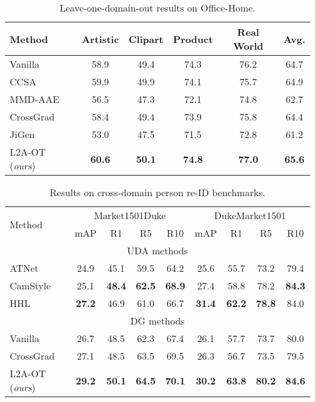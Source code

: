 \documentclass[runningheads]{llncs}
\begin{document}
\begin{table}[t]
\tabstyle{5pt}
\begin{tabular}{l | c c c c | c}
\hline
Method & Artistic & Clipart & Product & Real World & Avg. \\ \hline
Vanilla & 58.9 & 49.4 & {74.3} & {76.2} & 64.7 \\
CCSA~\cite{motiian2017unified} & {59.9} & {49.9} & 74.1 & 75.7 & {64.9} \\
MMD-AAE~\cite{li2018mmdaae} & 56.5 & 47.3 & 72.1 & 74.8 & 62.7 \\
CrossGrad~\cite{shankar2018generalizing} & 58.4 & 49.4 & 73.9 & 75.8 & 64.4 \\
JiGen~\cite{cvpr19JiGen} & 53.0 & 47.5 & 71.5 & 72.8 & 61.2 \\
L2A-OT  (\emph{ours}) & \textbf{60.6} & \textbf{50.1} & \textbf{74.8} & \textbf{77.0} & \textbf{65.6} \\
\hline
\end{tabular}
\caption{Leave-one-domain-out results on Office-Home.}
\label{tab:resOnOfficeHome}
\end{table}

\begin{table}[t]
\tabstyle{5pt}
\begin{tabular}{l | c c c c | c c c c}
\hline
\multirow{2}{*}{Method} & \multicolumn{4}{c|}{Market1501Duke} & \multicolumn{4}{c}{DukeMarket1501} \\
 & mAP & R1 & R5 & R10 & mAP & R1 & R5 & R10 \\
\hline
\multicolumn{9}{c}{UDA methods} \\
\hline
ATNet~\cite{liu2019adaptive} & 24.9 & 45.1 & 59.5 & 64.2 & 25.6 & 55.7 & 73.2 & 79.4 \\
CamStyle~\cite{zhong2019camstyle} & 25.1 & \textbf{48.4} & \textbf{62.5} & \textbf{68.9} & 27.4 & 58.8 & 78.2 & \textbf{84.3} \\
HHL~\cite{zhong2018gen} & \textbf{27.2} & 46.9 & 61.0 & 66.7 & \textbf{31.4} & \textbf{62.2} & \textbf{78.8} & 84.0 \\
\hline
\multicolumn{9}{c}{DG methods} \\
\hline
Vanilla & 26.7 & 48.5 & 62.3 & 67.4 & 26.1 & {57.7} & 73.7 & {80.0} \\
CrossGrad~\cite{shankar2018generalizing} & 27.1 & 48.5 & 63.5 & {69.5} & {26.3} & 56.7 & 73.5 & 79.5 \\
L2A-OT (\emph{ours}) & \textbf{29.2} & \textbf{50.1} & \textbf{64.5} & \textbf{70.1} & \textbf{30.2} & \textbf{63.8} & \textbf{80.2} & \textbf{84.6} \\
\hline
\end{tabular}
\caption{Results on cross-domain person re-ID benchmarks.}
\label{tab:resOnXdomReID}
\end{table}
\end{document}
